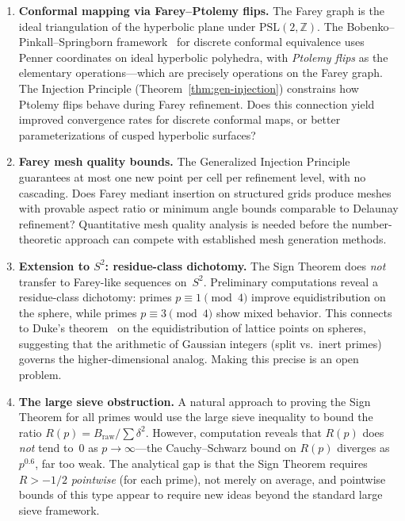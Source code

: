 \documentclass[11pt]{article}
\theoremstyle{definition}
\newcommand{\Z}{\mathbb{Z}}
\begin{document}
\begin{enumerate}
  \item \textbf{Conformal mapping via Farey--Ptolemy flips.}
    The Farey graph is the ideal triangulation of the hyperbolic
    plane under $\mathrm{PSL}(2,\Z)$.  The Bobenko--Pinkall--Springborn
    framework~\cite{BPS2015} for discrete conformal equivalence
    uses Penner coordinates on ideal hyperbolic polyhedra, with
    \emph{Ptolemy flips} as the elementary operations---which are
    precisely operations on the Farey graph.  The Injection
    Principle (Theorem~\ref{thm:gen-injection}) constrains how
    Ptolemy flips behave during Farey refinement.  Does this
    connection yield improved convergence rates for discrete
    conformal maps, or better parameterizations of cusped
    hyperbolic surfaces?

  \item \textbf{Farey mesh quality bounds.}
    The Generalized Injection Principle guarantees at most one
    new point per cell per refinement level, with no cascading.
    Does Farey mediant insertion on structured grids produce
    meshes with provable aspect ratio or minimum angle bounds
    comparable to Delaunay refinement?  Quantitative mesh
    quality analysis is needed before the number-theoretic
    approach can compete with established mesh generation methods.

  \item \textbf{Extension to $S^2$: residue-class dichotomy.}
    The Sign Theorem does \emph{not} transfer to Farey-like
    sequences on~$S^2$.  Preliminary computations reveal a
    residue-class dichotomy: primes $p \equiv 1 \pmod{4}$
    improve equidistribution on the sphere, while primes
    $p \equiv 3 \pmod{4}$ show mixed behavior.  This connects
    to Duke's theorem~\cite{Duke1988} on the equidistribution
    of lattice points on spheres, suggesting that the arithmetic
    of Gaussian integers (split vs.\ inert primes) governs the
    higher-dimensional analog.  Making this precise is an open
    problem.

  \item \textbf{The large sieve obstruction.}
    A natural approach to proving the Sign Theorem for all
    primes would use the large sieve inequality to bound the
    ratio $R(p) = B_{\mathrm{raw}} / \sum \delta^2$.  However,
    computation reveals that $R(p)$ does \emph{not} tend to~$0$
    as $p \to \infty$---the Cauchy--Schwarz bound on $R(p)$
    diverges as $p^{0.6}$, far too weak.  The analytical gap is
    that the Sign Theorem requires $R > -1/2$ \emph{pointwise}
    (for each prime), not merely on average, and pointwise
    bounds of this type appear to require new ideas beyond the
    standard large sieve framework.
\end{enumerate}
\end{document}
